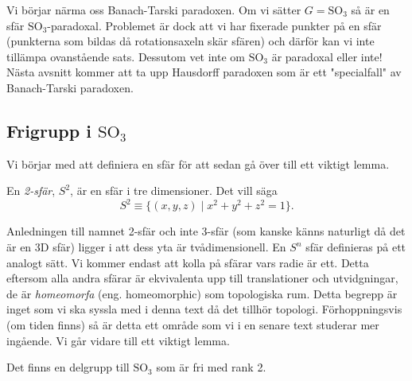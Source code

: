 \documentclass{article}
\theoremstyle{definition}
\begin{document}
Vi börjar närma oss Banach-Tarski paradoxen. Om vi sätter $G = \text{SO}_3$ så är en sfär $\text{SO}_3$-paradoxal. Problemet är dock 
att vi har fixerade punkter på en sfär (punkterna som bildas då rotationsaxeln skär sfären) och därför kan vi inte tillämpa ovanstående sats. 
Dessutom vet inte om $\text{SO}_3$ är paradoxal eller inte! Nästa avsnitt kommer att ta upp Hausdorff paradoxen som är 
ett "specialfall" av Banach-Tarski paradoxen. 

\subsection{Frigrupp i \texorpdfstring{$\text{SO}_3$}{}}
Vi börjar med att definiera en sfär för att sedan gå över till ett viktigt lemma.
\begin{mydef}{}{}
  En \textit{2-sfär}, $S^2$, är en sfär i tre dimensioner. Det vill säga 
  \[S^2 \equiv \{(x, y, z) \; | \; x^2 + y^2 + z^2 = 1\}.\]
\end{mydef}

Anledningen till namnet 2-sfär och inte 3-sfär (som kanske känns naturligt då det är en 3D sfär) ligger i att dess yta är tvådimensionell.
En $S^n$ sfär definieras på ett analogt sätt.
Vi kommer endast att kolla på sfärar vars radie är ett. Detta eftersom alla andra sfärar är ekvivalenta upp till translationer och utvidgningar, 
de är \textit{homeomorfa} (eng. homeomorphic) som topologiska rum. Detta begrepp är inget som vi ska syssla med i denna text då det tillhör 
topologi. Förhoppningsvis (om tiden finns) så är detta ett område som vi i en senare text studerar mer ingående. 
Vi går vidare till ett viktigt lemma.

\hypertarget{lemma8.3.1}{}
\begin{mylemma}{}{}
  Det finns en delgrupp till $\text{SO}_3$ som är fri med rank 2.
\end{mylemma}
\end{document}
